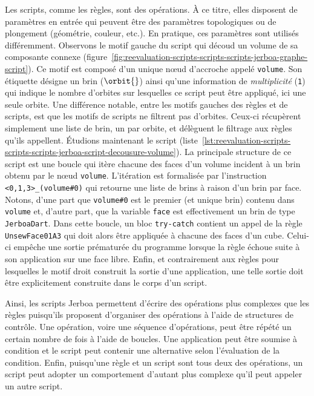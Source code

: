 Les scripts, comme les règles, sont des opérations. %
À ce titre, elles disposent de paramètres en entrée qui peuvent être des
paramètres topologiques ou de plongement (géométrie, couleur, etc.). %
En pratique, ces paramètres sont utilisés différemment. %
Observons le motif gauche du script qui découd un volume de sa composante
connexe
(figure~\ref{fig:reevaluation-scripts-scripts-scripts-jerboa-graphe-script}). %
Ce motif est composé d'un unique n\oe ud d'accroche appelé \texttt{volume}. %
Son étiquette désigne un brin (\(\orbit{}\)) ainsi qu'une information de
\textit{multiplicité} (\texttt{{1}}) qui indique le nombre d'orbites sur
lesquelles ce script peut être appliqué, ici une seule orbite. %
Une différence notable, entre les motifs gauches des règles et de scripts, est
que les motifs de scripts ne filtrent pas d'orbites. %
Ceux-ci récupèrent simplement une liste de brin, un par orbite, et délèguent le
filtrage aux règles qu'ils appellent. %
Étudions maintenant le script
(liste~\ref{lst:reevaluation-scripts-scripts-scripts-jerboa-script-decousure-volume}). %
La principale structure de ce script est une boucle qui itère chacune des faces
d'un volume incident à un brin obtenu par le n\oe ud \texttt{volume}. %
L'itération est formalisée par l'instruction
\texttt{<0,1,3>\_<0,1>(volume\#{}0)} qui retourne une liste de brins à raison
d'un brin par face. %
Notons, d'une part que \texttt{volume\#{}0} est le premier (et unique brin)
contenu dans \texttt{volume} et, d'autre part, que la variable \texttt{face} est
effectivement un brin de type \texttt{JerboaDart}. %
Dans cette boucle, un bloc \texttt{try-catch} contient un appel de la règle
\texttt{UnsewFace01A3} qui doit alors être appliquée à chacune des faces d'un
cube. %
Celui-ci empêche une sortie prématurée du programme lorsque la règle échoue
suite à son application sur une face libre. %
Enfin, et contrairement aux règles pour lesquelles le motif droit construit la
sortie d'une application, une telle sortie doit être explicitement construite
dans le corps d'un script. %

Ainsi, les scripts Jerboa permettent d'écrire des opérations plus complexes que
les règles puisqu'ils proposent d'organiser des opérations à l'aide de
structures de contrôle. %
Une opération, voire une séquence d'opérations, peut être répété un certain
nombre de fois à l'aide de boucles. %
Une application peut être soumise à condition et le script peut contenir une
alternative selon l'évaluation de la condition. %
Enfin, puisqu'une règle et un script sont tous deux des opérations, un script
peut adopter un comportement d'autant plus complexe qu'il peut appeler un autre
script. %


